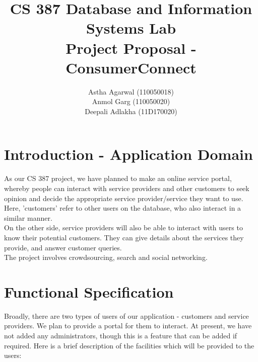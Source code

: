 \documentclass[a4paper]{article}
\title{CS 387 Database and Information Systems Lab\\
Project Proposal - ConsumerConnect}
\author{
Astha Agarwal (110050018)\\
Anmol Garg (110050020)\\
Deepali Adlakha (11D170020)}
\begin{document}
\maketitle


\section{Introduction - Application Domain}


As our CS 387 project, we have planned to make an online service portal, whereby people can interact with service providers and other customers to seek opinion and decide the appropriate service provider/service they want to use. Here, 'customers' refer to other users on the database, who also interact in a similar manner.\\On the other side, service providers will also be able to interact with users to know their potential customers. They can give details about the services they provide, and answer customer queries.\\The project involves crowdsourcing, search and social networking.

\section{Functional Specification}

Broadly, there are two types of users of our application - customers and service providers. We plan to provide a portal for them to interact. 
At present, we have not added any administrators, though this is a feature that can be added if required. Here is a brief description of the facilities which will be provided to the users:
\end{document}
